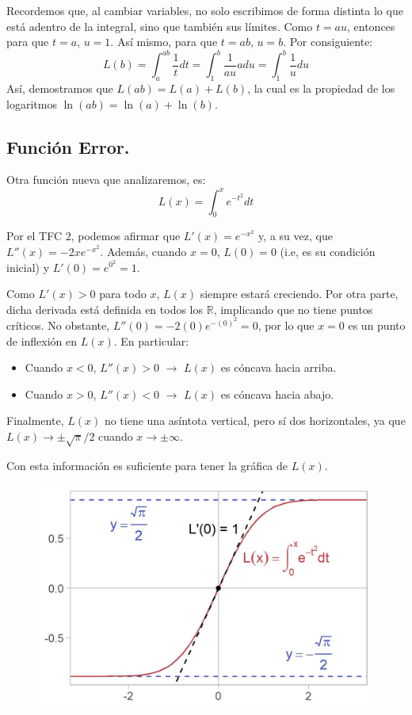 \documentclass[12pt]{article}
\begin{document}
Recordemos que, al cambiar variables, no solo escribimos de forma distinta lo que está adentro de la integral, sino que también sus límites. Como $t = au$, entonces para que $t = a$, $u = 1$. Así mismo, para que $t = ab$, $u = b$. Por consiguiente:
\[
  L(b) = \int_{a}^{ab} \frac{1}{t}dt = \int_{1}^{b} \frac{1}{au}adu = \int_{1}^{b} \frac{1}{u}du
\]
Así, demostramos que $L(ab) = L(a) + L(b)$, la cual es la propiedad de los logaritmos $\ln(ab) = \ln(a) + \ln(b)$.

\subsection{Función Error.}

Otra función nueva que analizaremos, es:
\[
  L(x) = \int_{0}^{x} e^{-t^{2}} dt
\]

Por el TFC 2, podemos afirmar que $L'(x) = e^{-x^{2}}$ y, a su vez, que $L''(x) = -2xe^{-x^{2}}$. Además, cuando $x = 0$, $L(0) = 0$ (i.e, es su condición inicial) y $L'(0) = e^{0^{2}} = 1$.

Como $L'(x) > 0$ para todo $x$, $L(x)$ siempre estará creciendo. Por otra parte, dicha derivada está definida en todos los $\mathbb{R}$, implicando que no tiene puntos críticos. No obstante, $L''(0) = -2(0)e^{-(0)^{2}} = 0$, por lo que $x = 0$ es un punto de inflexión en $L(x)$. En particular:

\begin{itemize}
\item Cuando $x < 0$, $L''(x) > 0$ $\rightarrow$ $L(x)$ es cóncava hacia arriba.
\item Cuando $x > 0$, $L''(x) < 0$ $\rightarrow$ $L(x)$ es cóncava hacia abajo.
\end{itemize}

Finalmente, $L(x)$ no tiene una asíntota vertical, pero sí dos horizontales, ya que $L(x) \to \pm \sqrt{\pi}/2$ cuando $x \to \pm \infty$.

Con esta información es suficiente para tener la gráfica de $L(x)$.

\begin{figure}[hbt!]
\centering
\includegraphics[scale=0.7]{img/pre_erf_plot.jpg}
\end{figure}
\end{document}
